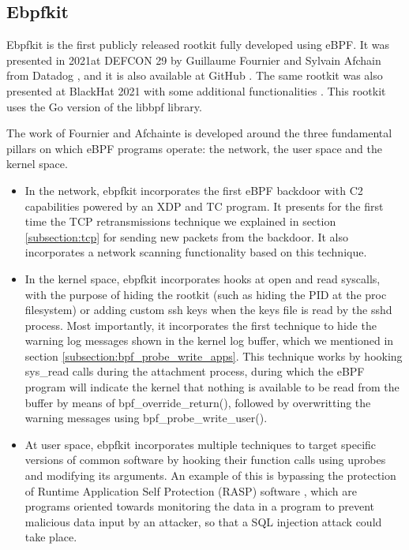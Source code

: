 \subsection{Ebpfkit}
Ebpfkit is the first publicly released rootkit fully developed using eBPF.
It was presented in 2021at DEFCON 29 by Guillaume Fournier and Sylvain Afchain from
Datadog \cite{ebpf_friends}, and it is also available at
GitHub \cite{ebpf_friends_github}. The same rootkit was also presented at
BlackHat 2021 with some additional functionalities
\cite{ebpf_friends_blackhat}. This rootkit uses the Go version of the
libbpf library.

The work of Fournier and Afchainte is developed around the three
fundamental pillars on which eBPF programs operate: the network, the user
space and the kernel space.
\begin{itemize}
\item In the network, ebpfkit incorporates the first eBPF backdoor with C2 capabilities powered by an XDP and TC program. It presents for the first time the TCP retransmissions technique we explained in section \ref{subsection:tcp} for sending new packets from the backdoor. It also incorporates a network scanning functionality based on this technique.
\item In the kernel space, ebpfkit incorporates hooks at open and read syscalls, with the purpose of hiding the rootkit (such as hiding the PID at the proc filesystem) or adding custom ssh keys when the keys file is read by the sshd process. Most importantly, it incorporates the first technique to hide the warning log messages shown in the kernel log buffer, which we mentioned in section \ref{subsection:bpf_probe_write_apps}. This technique works by hooking sys\_read calls during the attachment process, during which the eBPF program will indicate the kernel that nothing is available to be read from the buffer by means of bpf\_override\_return(), followed by overwritting the warning messages using bpf\_probe\_write\_user().
\item At user space, ebpfkit incorporates multiple techniques to target specific versions of common software by hooking their function calls using uprobes and modifying its arguments. An example of this is bypassing the protection of Runtime Application Self Protection (RASP) software \cite{rasps}, which are programs oriented towards monitoring the data in a program to prevent malicious data input by an attacker, so that a SQL injection attack \cite{sql_injection} could take place.
\end{itemize}

